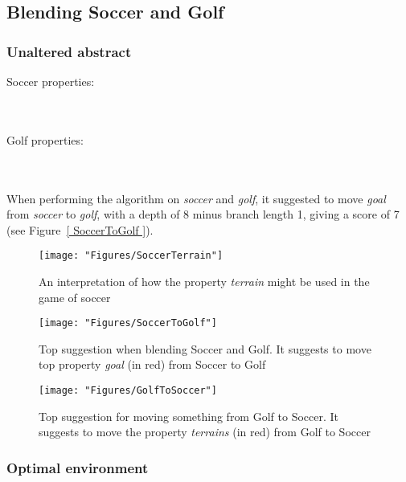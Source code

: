 \subsection{Blending Soccer and Golf }

\subsubsection{Unaltered abstract}

Soccer properties:

\noindent{}
\\\\Golf properties:
	
\noindent{}
\\\\When performing the algorithm on \emph{soccer} and \emph{golf}, it suggested to move \emph{goal} from \emph{soccer} to \emph{golf}, with a depth of 8 minus branch length 1, giving a score of 7 (see Figure~\ref{ SoccerToGolf }).


\begin{figure} \centering \texttt{[image: "Figures/SoccerTerrain"]} \caption{An interpretation of how the property \emph{terrain} might be used in the game of soccer} \label{fig:SoccerTerrain} \end{figure}

\begin{figure} \centering \texttt{[image: "Figures/SoccerToGolf"]} \caption{Top suggestion when blending Soccer and Golf. It suggests to move top property \emph{goal} (in red) from Soccer to Golf } \label{fig:SoccerToGolf} \end{figure}

\begin{figure} \centering \texttt{[image: "Figures/GolfToSoccer"]} \caption{Top suggestion for moving something from Golf to Soccer. It suggests to move the property \emph{terrains} (in red) from Golf to Soccer } \label{fig:GolfToSoccer} \end{figure}

\subsubsection{Optimal environment}



